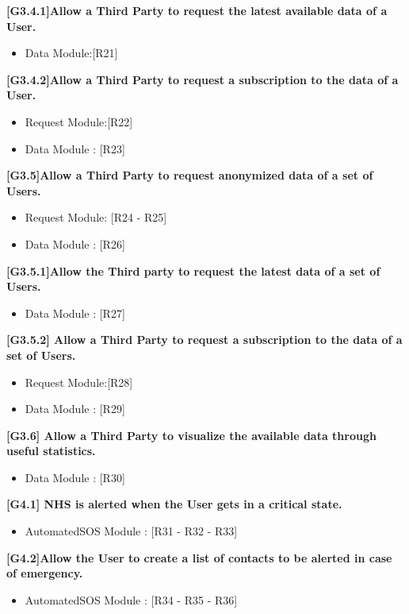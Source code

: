 \textbf{[G3.4.1]Allow a Third Party to request the latest available data of a User.}
\begin{itemize}
	\item Data Module:[R21]
\end{itemize}

\textbf{[G3.4.2]Allow a Third Party to request a subscription to the data of a User.}
\begin{itemize}
	\item Request Module:[R22]
	\item Data Module : [R23]
\end{itemize}

\textbf{[G3.5]Allow a Third Party to request anonymized data of a set of Users.}
\begin{itemize}
	\item Request Module: [R24 - R25]
	\item Data Module : [R26]
\end{itemize}

\textbf{[G3.5.1]Allow the Third party to request the latest data of a set of Users.}
\begin{itemize}
	\item Data Module : [R27]
\end{itemize}

\textbf{[G3.5.2] Allow a Third Party to request a subscription to the data of a set of Users.}
\begin{itemize}
	\item Request Module:[R28]
	\item Data Module : [R29]
\end{itemize}

\textbf{[G3.6] Allow a Third Party to visualize the available data through useful statistics.}
\begin{itemize}
	\item Data Module : [R30]
\end{itemize}

\textbf{[G4.1] NHS is alerted when the User gets in a critical state.}
\begin{itemize}
	\item AutomatedSOS Module : [R31 - R32 - R33]
\end{itemize}

\textbf{[G4.2]Allow the User to create a list of contacts to be alerted in case of emergency.}
\begin{itemize}
	\item AutomatedSOS Module : [R34 - R35 - R36]
\end{itemize}

